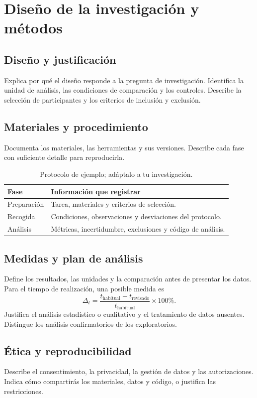 \chapter{Diseño de la investigación y métodos}
\label{ch:methods}
\section{Diseño y justificación}
Explica por qué el diseño responde a la pregunta de investigación. Identifica
la unidad de análisis, las condiciones de comparación y los controles.
Describe la selección de participantes y los criterios de inclusión y exclusión.
\section{Materiales y procedimiento}
Documenta los materiales, las herramientas y sus versiones. Describe cada fase
con suficiente detalle para reproducirla.
\begin{table}[htbp]
\centering
\caption{Protocolo de ejemplo; adáptalo a tu investigación.}
\begin{tabularx}{\linewidth}{@{}lX@{}}
\toprule
\textbf{Fase} & \textbf{Información que registrar}\\
\midrule
Preparación & Tarea, materiales y criterios de selección.\\
Recogida & Condiciones, observaciones y desviaciones del protocolo.\\
Análisis & Métricas, incertidumbre, exclusiones y código de análisis.\\
\bottomrule
\end{tabularx}
\end{table}
\section{Medidas y plan de análisis}
Define los resultados, las unidades y la comparación antes de presentar los datos.
Para el tiempo de realización, una posible medida es
\begin{equation}
\Delta_t = \frac{t_{\mathrm{habitual}}-t_{\mathrm{revisado}}}{t_{\mathrm{habitual}}}\times100\%.
\end{equation}
Justifica el análisis estadístico o cualitativo y el tratamiento de datos ausentes.
Distingue los análisis confirmatorios de los exploratorios.
\section{Ética y reproducibilidad}
Describe el consentimiento, la privacidad, la gestión de datos y las autorizaciones.
Indica cómo compartirás los materiales, datos y código, o justifica las restricciones.
